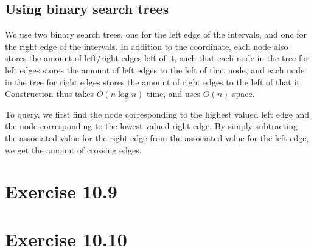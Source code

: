 \documentclass[11pt,a4paper]{article}
\begin{document}
\subsection{Using binary search trees}

We use two binary search trees, one for the left edge of the
intervals, and one for the right edge of the intervals. In addition to
the coordinate, each node also stores the amount of left/right edges
left of it, such that each node in the tree for left edges stores the
amount of left edges to the left of that node, and each node in the
tree for right edges stores the amount of right edges to the left of
that it. Construction thus takes $O(n \log n)$ time, and uses $O(n)$
space.

To query, we first find the node corresponding to the highest valued
left edge and the node corresponding to the lowest valued right
edge. By simply subtracting the associated value for the right edge
from the associated value for the left edge, we get the amount of
crossing edges.

\section{Exercise 10.9}

\section{Exercise 10.10}
\end{document}
